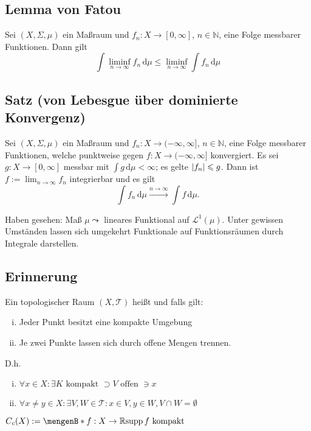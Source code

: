 \subsection{Lemma von Fatou} %
\label{sub:923}
Sei $(X, \Sigma, \mu)$ ein Maßraum und $f_n : X \to  [0,\infty]$, $n \in \mathds{N}$, eine Folge messbarer Funktionen. Dann gilt 
\[
	\int\! \liminf_{n \to \infty} f_n  \, \mathrm{d}\mu \le \liminf_{n \to \infty} \int\! f_n  \, \mathrm{d}\mu
\]

\subsection{Satz (von Lebesgue über dominierte Konvergenz)} %
\label{sub:924}
Sei $(X, \Sigma,  \mu)$ ein Maßraum und $f_n : X \to (-\infty,\infty]$, $n \in \mathds{N} $, eine Folge messbarer Funktionen, welche punktweise gegen 
$f : X  \to (-\infty, \infty]$ konvergiert. Es sei $g : X \to [0,\infty]$ messbar mit $\int\! g  \, \mathrm{d}\mu < \infty$; es gelte $\abs*{f_n} \le g $.
Dann ist $f := \lim_{ n \to \infty} f_n$ integrierbar und es gilt
\[
	\int\! f_n  \, \mathrm{d}\mu \xrightarrow{n \to \infty} \int\! f  \, \mathrm{d}\mu.
\]

Haben gesehen: Maß $\mu \leadsto$ lineares Funktional auf $\mathcal{L}^1(\mu)$. Unter gewissen Umständen lassen sich umgekehrt Funktionale auf Funktionsräumen durch Integrale
darstellen.

\subsection*{Erinnerung} %
\label{sub:erinnerung}
Ein topologischer Raum $(X, \mathcal{T} )$ heißt  und  falls gilt:
\begin{enumerate}[(i)]
	\item Jeder Punkt besitzt eine kompakte Umgebung
	\item Je zwei Punkte lassen sich durch offene Mengen trennen.
\end{enumerate}
D.h. 
\begin{enumerate}[(i)]
	\item $\forall x \in X : \exists K \text{ kompakt }\supset V \text{ offen } \ni x$
	\item $\forall x \not= y \in X : \exists V,W \in \mathcal{T}: x \in V, y \in W, V \cap W = \emptyset$
\end{enumerate} 
$C_c(X) := \set[f : X \to \mathds{R}]{\supp f \text{ kompakt}} $ 

